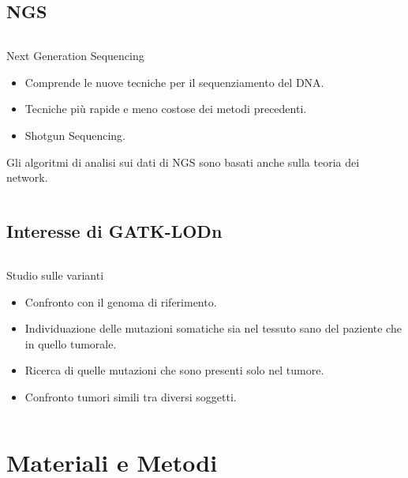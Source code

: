 \documentclass{beamer}
\begin{document}
\subsection{NGS}
\begin{frame}
\begin{columns}
\begin{column}{0.8\linewidth}
\begin{block}{Next Generation Sequencing}
\begin{itemize}
\item Comprende le nuove tecniche per il sequenziamento del 
DNA.
\item Tecniche più rapide e meno costose dei metodi precedenti.
\item Shotgun Sequencing.
\end{itemize}
\end{block}
\begin{block}{}
Gli algoritmi di analisi sui dati di NGS sono basati anche sulla teoria dei network.
\end{block}
\end{column}
\end{columns}
\end{frame}

\subsection{Interesse di GATK-LODn}
\begin{frame}
\begin{columns}
\begin{column}{0.8\linewidth}
\begin{block}{Studio sulle varianti}
\begin{itemize}
\item Confronto con il genoma di riferimento.
\item Individuazione delle mutazioni somatiche sia nel tessuto sano del paziente che in quello tumorale.
\item Ricerca di quelle mutazioni che sono presenti solo nel tumore.
\item Confronto tumori simili tra diversi soggetti.
\end{itemize}
\end{block}
\end{column}
\end{columns}
\end{frame}

\section{Materiali e Metodi}
\end{document}
